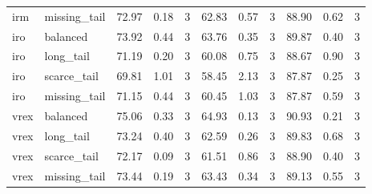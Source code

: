 \begin{tabular}{lllllllllll}
irm & missing\_tail & 72.97 & 0.18 & 3 & 62.83 & 0.57 & 3 & 88.90 & 0.62 & 3 \\
iro & balanced & 73.92 & 0.44 & 3 & 63.76 & 0.35 & 3 & 89.87 & 0.40 & 3 \\
iro & long\_tail & 71.19 & 0.20 & 3 & 60.08 & 0.75 & 3 & 88.67 & 0.90 & 3 \\
iro & scarce\_tail & 69.81 & 1.01 & 3 & 58.45 & 2.13 & 3 & 87.87 & 0.25 & 3 \\
iro & missing\_tail & 71.15 & 0.44 & 3 & 60.45 & 1.03 & 3 & 87.87 & 0.59 & 3 \\
vrex & balanced & 75.06 & 0.33 & 3 & 64.93 & 0.13 & 3 & 90.93 & 0.21 & 3 \\
vrex & long\_tail & 73.24 & 0.40 & 3 & 62.59 & 0.26 & 3 & 89.83 & 0.68 & 3 \\
vrex & scarce\_tail & 72.17 & 0.09 & 3 & 61.51 & 0.86 & 3 & 88.90 & 0.40 & 3 \\
vrex & missing\_tail & 73.44 & 0.19 & 3 & 63.43 & 0.34 & 3 & 89.13 & 0.55 & 3 \\
\bottomrule
\end{tabular}
